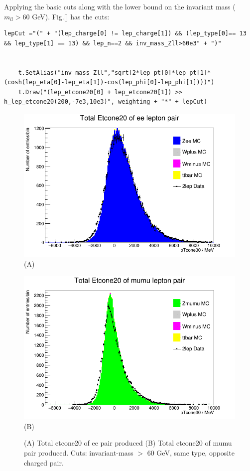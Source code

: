 Applying the basic cuts along with the lower bound on the invariant mass ($m_{ll} > 60$ GeV).  Fig.\ref{} has the cuts:
\begin{lstlisting}
lepCut ="(" + "(lep_charge[0] != lep_charge[1]) && (lep_type[0]== 13 && lep_type[1] == 13) && lep_n==2 && inv_mass_Zll>60e3" + ")"    
    
    
    t.SetAlias("inv_mass_Zll","sqrt(2*lep_pt[0]*lep_pt[1]*(cosh(lep_eta[0]-lep_eta[1])-cos(lep_phi[0]-lep_phi[1])))")
    t.Draw("(lep_etcone20[0] + lep_etcone20[1]) >> h_lep_etcone20(200,-7e3,10e3)", weighting + "*" + lepCut)
\end{lstlisting}

\begin{figure}[h!]
    \centering
    \begin{minipage}{0.5\textwidth}
        \centering
        \includegraphics[width=\linewidth]{plots/25-02-2021/Zee-stack_total-etcone_(inv-mass-lower=60GeV_2lep=e+e-)_25-02-21_11-20.png}
        (A)
    \end{minipage}\hfill
    \begin{minipage}{0.5\textwidth}
        \centering
        \includegraphics[width=\linewidth]{plots/25-02-2021/Zmumu-stack_total-etcone_(inv-mass-lower=60GeV_2lep=mu+mu-)_25-02-21_11-20).png}
        (B)
    \end{minipage}
    \caption{(A) Total etcone20 of ee pair produced (B) Total etcone20 of mumu pair produced. Cuts: invariant-mass $>$ 60 GeV, same type, opposite charged pair.}
    \label{fig:}
\end{figure}


